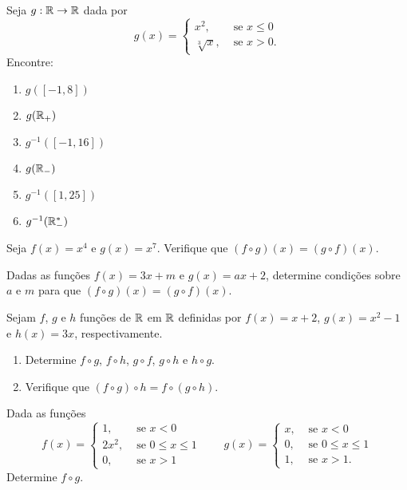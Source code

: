 \documentclass[12pt]{exam}
\begin{document}
\vspace{.3cm}

\questao Seja $g : \mathbb{R} \to \mathbb{R}$ dada por
\[
	g(x) = \begin{cases}
		x^2,& \mbox{ se } x \le 0\\
		\sqrt[3]{x}, & \mbox{ se } x > 0.
	\end{cases}
\]
Encontre:
\begin{multicols}{2}
	\begin{enumerate}[label={\alph*})]
		\item $g([-1,8])$
		\item $g(\mathbb{R}_+)$
		\item $g^{-1}([-1,16])$
		\item $g(\mathbb{R}_-)$
		\item $g^{-1}([1,25])$
		\item $g^{-1}(\mathbb{R}^*_-)$
	\end{enumerate}	
\end{multicols}


\vspace{.3cm}

\questao Seja $f(x) = x^4$ e $g(x) = x^7$. Verifique que $(f\circ g)(x) = (g\circ f)(x)$.

\vspace{.3cm}

\questao Dadas as fun\c{c}\~oes $f(x) = 3x + m$ e $g(x) = ax + 2$, determine condi\c{c}\~oes sobre $a$ e $m$ para que $(f\circ g)(x) = (g\circ f)(x)$.

\newpage

\questao Sejam $f$, $g$ e $h$ fun\c{c}\~oes de $\mathbb{R}$ em $\mathbb{R}$ definidas por $f(x) = x + 2$, $g(x) = x^2 - 1$ e $h(x) = 3x$, respectivamente.
\begin{enumerate}[label={\alph*})]
	\item Determine $f \circ g$, $f \circ h$, $g \circ f$, $g \circ h$ e $h \circ g$.
	\item Verifique que $(f \circ g)\circ h = f \circ (g \circ h)$.
\end{enumerate}

\vspace{.3cm}

\questao Dada as fun\c{c}\~oes
\[
	f(x) = \begin{cases}
		1, & \mbox{ se } x < 0\\
		2x^2, & \mbox{ se } 0 \le x \le 1\\
		0, & \mbox{ se } x > 1
	\end{cases} \qquad g(x) = \begin{cases}
		x, & \mbox{ se } x < 0\\
		0, & \mbox{ se } 0 \le x \le 1\\
		1, & \mbox{ se } x > 1.
	\end{cases}
\]
Determine $f\circ g$.
\end{document}
